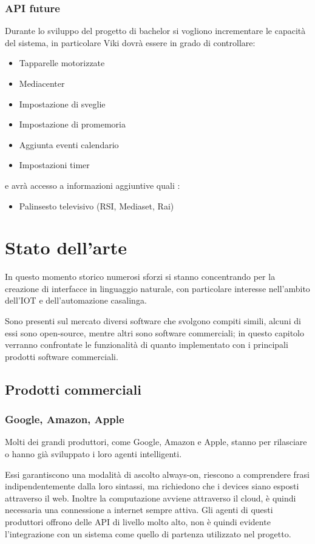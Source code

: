 \documentclass[twoside]{supsistudent}
\begin{document}
\subsection{API future}
Durante lo sviluppo del progetto di bachelor si vogliono incrementare le capacità del sistema, in particolare Viki dovrà essere in grado di controllare:
\begin{itemize}
  \item Tapparelle motorizzate
  \item Mediacenter
  \item Impostazione di sveglie
  \item Impostazione di promemoria
  \item Aggiunta eventi calendario
  \item Impostazioni timer
\end{itemize}
e avrà accesso a informazioni aggiuntive quali :
\begin{itemize}
  \item Palinsesto televisivo (RSI, Mediaset, Rai)
\end{itemize}

\chapter{Stato dell'arte}

In questo momento storico numerosi sforzi si stanno concentrando per la creazione di interfacce in linguaggio naturale, con particolare interesse nell'ambito dell'IOT  e dell'automazione casalinga. 

Sono presenti sul mercato diversi software che svolgono compiti simili, alcuni di essi sono open-source, mentre altri sono software commerciali; in questo capitolo verranno confrontate le funzionalità di quanto implementato con i principali prodotti software commerciali.
\section{Prodotti commerciali}
\subsection{Google, Amazon, Apple}
Molti dei grandi produttori, come Google, Amazon e Apple, stanno per rilasciare o hanno già sviluppato i loro agenti intelligenti. \cite{googleAgent}\cite{homekit}\cite{alexa}

Essi garantiscono una modalità di ascolto always-on, riescono a comprendere frasi indipendentemente dalla loro sintassi, ma richiedono che i devices siano esposti attraverso il web. Inoltre la computazione avviene attraverso il cloud, è quindi necessaria una connessione a internet sempre attiva.
Gli agenti di questi produttori offrono delle API di livello molto alto, non è quindi evidente l'integrazione con un sistema come quello di partenza utilizzato nel progetto.
\end{document}
